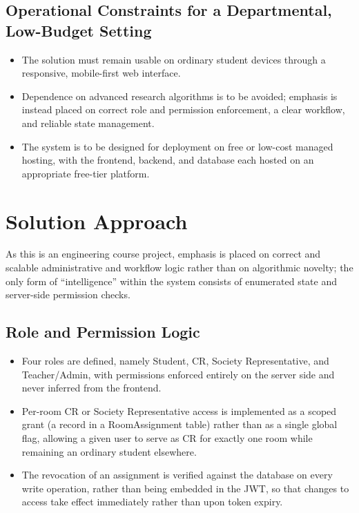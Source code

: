 \documentclass[11pt]{article}
\begin{document}
\subsection{Operational Constraints for a Departmental, Low-Budget Setting}

\begin{itemize}
    \item The solution must remain usable on ordinary student devices through a responsive, mobile-first web interface.
    \item Dependence on advanced research algorithms is to be avoided; emphasis is instead placed on correct role and permission enforcement, a clear workflow, and reliable state management.
    \item The system is to be designed for deployment on free or low-cost managed hosting, with the frontend, backend, and database each hosted on an appropriate free-tier platform.
\end{itemize}

\section{Solution Approach}

As this is an engineering course project, emphasis is placed on correct and scalable administrative and workflow logic rather than on algorithmic novelty; the only form of ``intelligence'' within the system consists of enumerated state and server-side permission checks.

\subsection{Role and Permission Logic}

\begin{itemize}
    \item Four roles are defined, namely Student, CR, Society Representative, and Teacher/Admin, with permissions enforced entirely on the server side and never inferred from the frontend.
    \item Per-room CR or Society Representative access is implemented as a scoped grant (a record in a RoomAssignment table) rather than as a single global flag, allowing a given user to serve as CR for exactly one room while remaining an ordinary student elsewhere.
    \item The revocation of an assignment is verified against the database on every write operation, rather than being embedded in the JWT, so that changes to access take effect immediately rather than upon token expiry.
\end{itemize}
\end{document}
